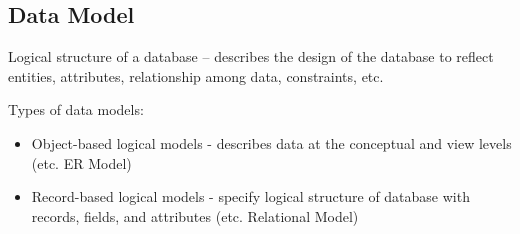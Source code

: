 \documentclass{article}
\begin{document}
    \subsection*{Data Model}

    Logical structure of a database -- describes the design of the database to 
    reflect entities, attributes, relationship among data, constraints, etc. 

    Types of data models:
    \begin{itemize}
        \item Object-based logical models - describes data at the conceptual 
        and view levels (etc. ER Model)
        \item Record-based logical models - specify logical structure of database 
        with records, fields, and attributes (etc. Relational Model)
    \end{itemize}
\end{document}
